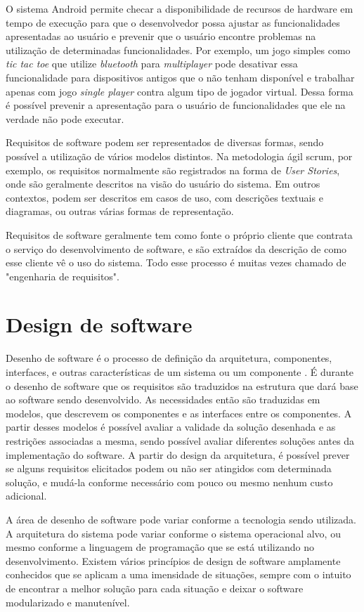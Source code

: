 O sistema Android permite checar a disponibilidade de recursos de hardware em tempo de execução para que o desenvolvedor possa ajustar as funcionalidades apresentadas ao usuário e prevenir que o usuário encontre problemas na utilização de determinadas funcionalidades. Por exemplo, um jogo simples como \textit{tic tac toe} que utilize \textit{bluetooth} para \textit{multiplayer} pode desativar essa funcionalidade para dispositivos antigos que o não tenham disponível e trabalhar apenas com jogo \textit{single player} contra algum tipo de jogador virtual. Dessa forma é possível prevenir a apresentação para o usuário de funcionalidades que ele na verdade não pode executar.

Requisitos de software podem ser representados de diversas formas, sendo possível a utilização de vários modelos distintos. Na metodologia ágil scrum, por exemplo, os requisitos normalmente são registrados na forma de \textit{User Stories}, onde são geralmente descritos na visão do usuário do sistema. Em outros contextos, podem ser descritos em casos de uso, com descrições textuais e diagramas, ou outras várias formas de representação.

Requisitos de software geralmente tem como fonte o próprio cliente que contrata o serviço do desenvolvimento de software, e são extraídos da descrição de como esse cliente vê o uso do sistema. Todo esse processo é muitas vezes chamado de "engenharia de requisitos".

\section{Design de software}

Desenho de software é o processo de definição da arquitetura, componentes, interfaces, e outras características de um sistema ou um componente \cite{swebok}. É durante o desenho de software que os requisitos são traduzidos na estrutura que dará base ao software sendo desenvolvido. As necessidades então são traduzidas em modelos, que descrevem os componentes e as interfaces entre os componentes. A partir desses modelos é possível avaliar a validade da solução desenhada e as restrições associadas a mesma, sendo possível avaliar diferentes soluções antes da implementação do software. A partir do design da arquitetura, é possível prever se alguns requisitos elicitados podem ou não ser atingidos com determinada solução, e mudá-la conforme necessário com pouco ou mesmo nenhum custo adicional.

A área de desenho de software pode variar conforme a tecnologia sendo utilizada. A arquitetura do sistema pode variar conforme o sistema operacional alvo, ou mesmo conforme a linguagem de programação que se está utilizando no desenvolvimento. Existem vários princípios de design de software amplamente conhecidos que se aplicam a uma imensidade de situações, sempre com o intuito de encontrar a melhor solução para cada situação e deixar o software modularizado e manutenível.


